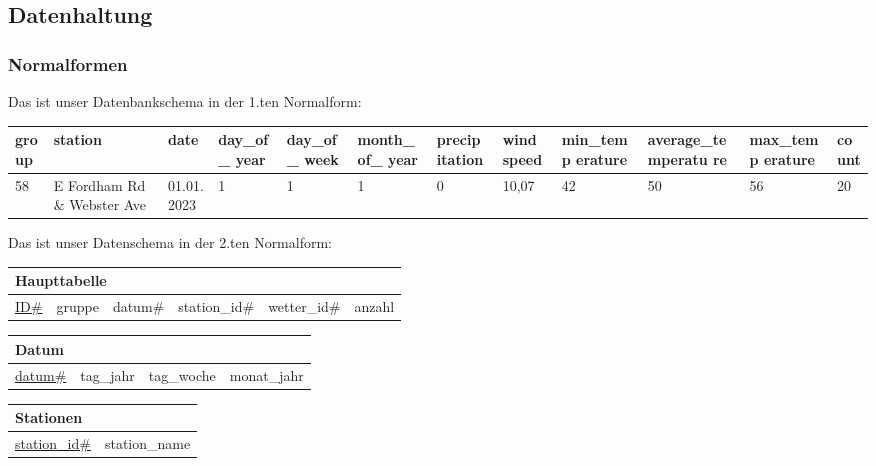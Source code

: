 \documentclass{article}
\begin{document}
\subsection{Datenhaltung}

\subsubsection{Normalformen}
Das ist unser Datenbankschema in der 1.ten Normalform:
\begin{tiny}
\begin{center}
\begin{tabular}{|m{3em}|m{1cm}|m{1cm}|m{1cm}|m{1cm}|m{1cm}|m{}|m{}|m{1cm}|m{}|m{1cm}|m{}|}
\hline
    group & station & date & day\_of\_ year & day\_of\_ week & month\_of\_ year & precip itation & wind  speed & min\_temp erature & average\_te mperatu re & max\_temp erature & count \\
    \hline
    58 & E Fordham Rd \& Webster Ave & 01.01.2023& 1 & 1 & 1 & 0 & 10,07 & 42 & 50 & 56 & 20 \\
    \hline
\end{tabular}
\end{center}
\end{tiny}
Das ist unser Datenschema in der 2.ten Normalform:
\begin{center}
    \begin{tabular}{|m{2cm}|m{2cm}|m{2cm}|m{2cm}|m{2cm}|m{2cm}|}
    \hline
    \multicolumn{6}{|l|}{Haupttabelle}\\
    \hline
         \underline{ID\#}& gruppe & datum\# & station\_id\# & wetter\_id\# & anzahl \\
         \hline 
    \end{tabular}
\end{center}

\begin{flushleft}
    \begin{tabular}{|m{2cm}|m{2cm}|m{2cm}|m{2cm}|}
    \hline
    \multicolumn{4}{|l|}{Datum}\\
    \hline
        \underline{datum\#} & tag\_jahr & tag\_woche & monat\_jahr  \\
         \hline
    \end{tabular}
\end{flushleft}

\begin{flushleft}
    \begin{tabular}{|m{2cm}|m{2cm}|}
    \hline
    \multicolumn{2}{|l|}{Stationen}\\
    \hline
        \underline{station\_id\#} & station\_name \\
        \hline
    \end{tabular}{}
\end{flushleft}
\end{document}
